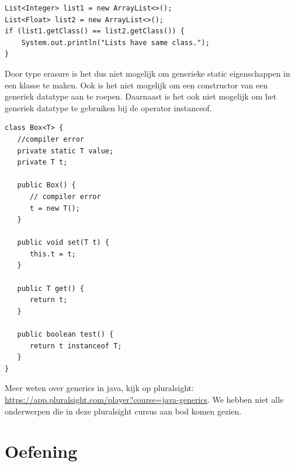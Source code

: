 \begin{lstlisting}
List<Integer> list1 = new ArrayList<>();
List<Float> list2 = new ArrayList<>();
if (list1.getClass() == list2.getClass()) {
	System.out.println("Lists have same class.");
}
\end{lstlisting}

Door type erasure is het dus niet mogelijk om generieke static eigenschappen in een klasse te maken.
Ook is het niet mogelijk om een constructor van een generiek datatype aan te roepen.
Daarnaast is het ook niet mogelijk om het generiek datatype te gebruiken bij de operator instanceof.

\begin{lstlisting}
class Box<T> {
   //compiler error
   private static T value;
   private T t;
   
   public Box() {
      // compiler error
   	  t = new T();
   }

   public void set(T t) {
      this.t = t;
   }

   public T get() {
      return t;
   } 
   
   public boolean test() {
	  return t instanceof T;
   }  
}
\end{lstlisting}

\begin{remark}
  Meer weten over generics in java, kijk op pluralsight: \url{https://app.pluralsight.com/player?course=java-generics}. We hebben niet alle onderwerpen die in deze pluralsight cursus aan bod komen gezien.
\end{remark}


\section{Oefening}

